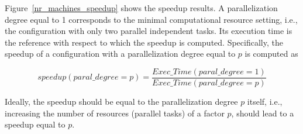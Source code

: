 \documentclass[preprint,review,12pt]{elsarticle}
\begin{document}
Figure~\ref{nr_machines_speedup} shows the speedup results. 
A parallelization degree equal to 1 corresponds to the minimal computational resource setting, i.e., the configuration with only two parallel independent tasks.
Its execution time is the reference with respect to which the speedup is computed. 
Specifically, the speedup of a configuration with a parallelization degree equal to $p$ is computed as 

$$speedup(paral\_degree=p)=\frac{Exec\_Time(paral\_degree=1)}{Exec\_Time(paral\_degree=p)}$$ 

Ideally, the speedup should be equal to the parallelization degree $p$ itself, i.e., 
increasing the number of resources (parallel tasks) of a factor $p$, should lead to a speedup equal to $p$.
\end{document}
